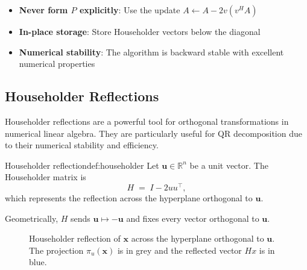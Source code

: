 \begin{itemize}
    \item \textbf{Never form $P$ explicitly}: Use the update $A \leftarrow A - 2v(v^H A)$
    \item \textbf{In-place storage}: Store Householder vectors below the diagonal
    \item \textbf{Numerical stability}: The algorithm is backward stable with excellent numerical properties
\end{itemize}

\subsection{Householder Reflections}
Householder reflections are a powerful tool for orthogonal transformations in numerical linear algebra. They are particularly useful for QR decomposition due to their numerical stability and efficiency.

\begin{definition}{Householder reflection}{def:householder}
    Let $\mathbf{u} \in \mathbb{R}^n$ be a unit vector. The Householder matrix is
    \[
        H \;=\; I - 2uu^\top,
    \]
    which represents the reflection across the hyperplane orthogonal to $\mathbf{u}$.
\end{definition}

Geometrically, $H$ sends $\mathbf{u} \mapsto -\mathbf{u}$ and fixes every vector orthogonal to $\mathbf{u}$.

\begin{figure}[htb]
    \centering
    
    \caption{Householder reflection of $\mathbf{x}$ across the hyperplane orthogonal to $\mathbf{u}$. The projection $\pi_u(\mathbf{x})$ is in grey and the reflected vector $Hx$ is in blue.}
    \label{fig:householder-reflection}
\end{figure}

